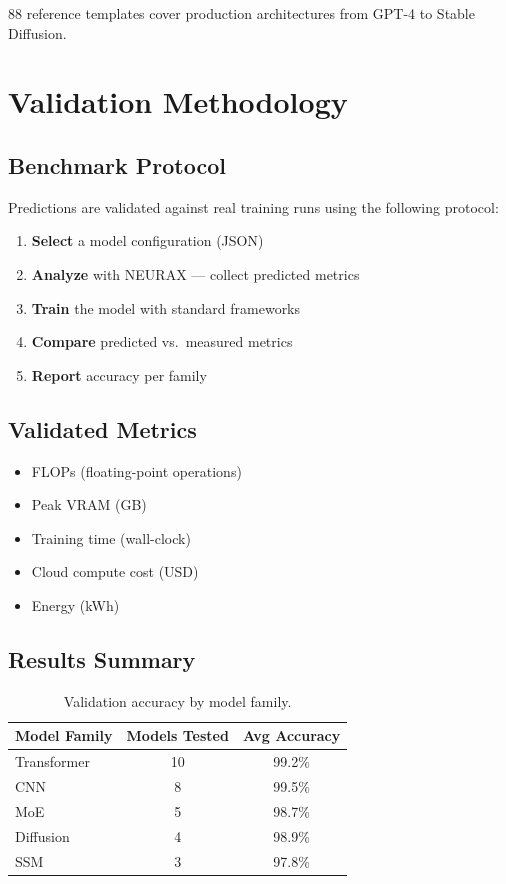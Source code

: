 \documentclass[11pt]{article}
\begin{document}
88 reference templates cover production architectures from GPT-4 to Stable Diffusion.

\section{Validation Methodology}

\subsection{Benchmark Protocol}

Predictions are validated against real training runs using the following protocol:
\begin{enumerate}
  \item \textbf{Select} a model configuration (JSON)
  \item \textbf{Analyze} with NEURAX --- collect predicted metrics
  \item \textbf{Train} the model with standard frameworks
  \item \textbf{Compare} predicted vs.\ measured metrics
  \item \textbf{Report} accuracy per family
\end{enumerate}

\subsection{Validated Metrics}
\begin{itemize}
  \item FLOPs (floating-point operations)
  \item Peak VRAM (GB)
  \item Training time (wall-clock)
  \item Cloud compute cost (USD)
  \item Energy (kWh)
\end{itemize}

\subsection{Results Summary}

\begin{table}[ht]
\centering
\caption{Validation accuracy by model family.}
\begin{tabular}{@{}l c c@{}}
\toprule
\textbf{Model Family} & \textbf{Models Tested} & \textbf{Avg Accuracy} \\
\midrule
Transformer & 10 & 99.2\% \\
CNN & 8 & 99.5\% \\
MoE & 5 & 98.7\% \\
Diffusion & 4 & 98.9\% \\
SSM & 3 & 97.8\% \\
\bottomrule
\end{tabular}
\label{tab:results}
\end{table}
\end{document}
